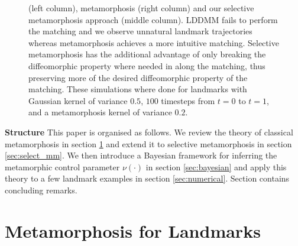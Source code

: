 \documentclass[runningheads]{llncs}
\begin{document}
\begin{figure}
\begin{minipage}{\textwidth}
{    (left column), metamorphosis (right column) and our selective metamorphosis
    approach (middle column). LDDMM fails to perform the matching and we observe
    unnatural landmark trajectories whereas metamorphosis achieves a more
    intuitive matching. Selective metamorphosis has the additional advantage of
    only breaking the diffeomorphic property where needed in along the matching,
    thus preserving more of the desired diffeomorphic property of the matching.
    These simulations where done for landmarks with Gaussian kernel of variance 
  $0.5$, $100$ timesteps from $t=0$ to $t=1$, and a metamorphosis kernel 
of variance $0.2$.}
    \label{fig:mm_lddmm}
\end{minipage}
\end{figure}

{\bf Structure} This paper is organised as follows. We review the theory of
classical metamorphosis in section \ref{sec:bg} and extend it to selective
metamorphosis in section \ref{sec:select_mm}.  We then introduce a Bayesian
framework for inferring the metamorphic control parameter $\nu(\cdot)$ in
section \ref{sec:bayesian} and apply this theory to a few landmark examples in
section \ref{sec:numerical}. Section \label{sec:outlook} contains concluding
remarks.

\section{Metamorphosis for Landmarks}\label{sec:bg}
\end{document}
